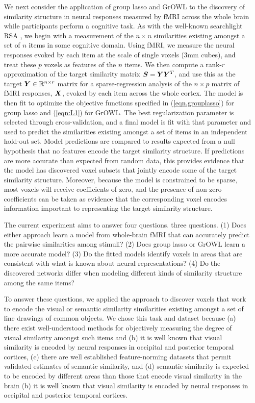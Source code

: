 We next consider the application of group lasso and GrOWL to the discovery of similarity
structure in neural responses measured by fMRI across the whole brain while participants
perform a cognitive task. As with the well-known searchlight RSA \citep{RSA},
we begin with a measurement of the $n \times n $ similarities existing
amongst a set of $n$ items in some cognitive domain. Using fMRI, we measure the neural
responses evoked by each item at the scale of single voxels (3mm cubes), and treat these
$p$ voxels as features of the $n$ items. We then compute a rank-$r$ approximation of the
target similarity matrix $\boldsymbol{S} = \boldsymbol{Y} \boldsymbol{Y}^T$, and use this as the target $\boldsymbol{Y} \in {\mathbb R}^{n
  \times r} $ matrix for a sparse-regression analysis of the $n \times p$ matrix of fMRI
responses, $\boldsymbol{X}$, evoked by each item across the whole cortex. The model is then fit to
optimize the objective functions specified in (\ref{eqn.grouplasso}) for group lasso and
(\ref{eqn:L1}) for GrOWL. The best regularization parameter is selected through
cross-validation, and a final model is fit with that parameter and used to predict the
similarities existing amongst a set of items in an independent hold-out set. Model
predictions are compared to results expected from a null hypothesis that no features
encode the target similarity structure. If predictions are more accurate than expected
from random data, this provides evidence that the model has discovered voxel subsets that
jointly encode some of the target similarity structure. Moreover, because the model is
constrained to be sparse, most voxels will receive coefficients of zero, and the presence
of non-zero coefficients can be taken as evidence that the corresponding voxel encodes
information important to representing the target similarity structure.

The current experiment aims to answer
\ifdefined\SEMANTIC
four questions.
\else
three questions.
\fi%
(1) Does either approach learn a model from whole-brain fMRI that can accurately predict
the pairwise similarities among stimuli?
(2) Does group lasso or GrOWL learn a more accurate model?
(3) Do the fitted models identify voxels in areas that are consistent with what is known
about neural representations?
\ifdefined\SEMANTIC
(4) Do the discovered networks differ when modeling different kinds of similarity structure
among the same items?
\fi%

To answer these questions, we applied the approach to discover voxels that work to encode
the visual or semantic similarity similarities existing amongst a set of line drawings of
common objects. We chose this task and dataset because
(a) there exist well-understood methods for objectively measuring the degree of visual
similarity amongst such items \citep{antani02} and
\ifdefined\SEMANTIC
(b) it is well known that visual similarity is encoded by neural responses in occipital and
posterior temporal cortices,
(c) there are well established feature-norming datasets that permit validated estimates of
semantic similarity, and
(d) semantic similarity is expected to be encoded by different areas than those that encode
visual similarity in the brain
\else
(b) it is well known that visual similarity is encoded by neural responses in occipital and
posterior temporal cortices.
\fi%

